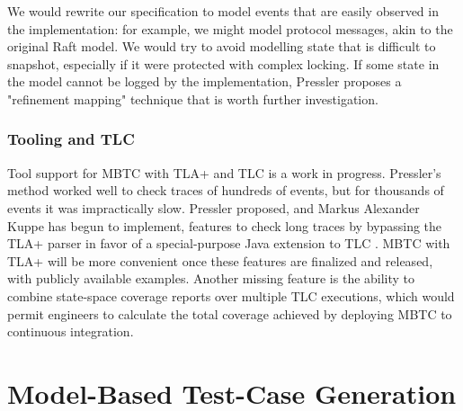 \documentclass{vldb}
\begin{document}
We would rewrite our specification to model events that are easily observed in the implementation: for example, we might model protocol messages, akin to the original Raft model.
We would try to avoid modelling state that is difficult to snapshot, especially if it were protected with complex locking.
If some state in the model cannot be logged by the implementation, Pressler proposes a "refinement mapping" technique \cite{Pressler18VerifyingSoftwareTracesTLAPlus} that is worth further investigation.

\subsubsection{Tooling and TLC}
\label{subsubsec:mbtc_tla_tlc}

Tool support for MBTC with TLA+ and TLC is a work in progress. 
Pressler's method worked well to check traces of hundreds of events, but for thousands of events it was impractically slow. 
Pressler proposed, and Markus Alexander Kuppe has begun to implement, features to check long traces by bypassing the TLA+ parser in favor of a special-purpose Java extension to TLC \cite{TLAPlusIssue413}. 
MBTC with TLA+ will be more convenient once these features are finalized and released, with publicly available examples. 
Another missing feature is the ability to combine state-space coverage reports over multiple TLC executions, which would permit engineers to calculate the total coverage achieved by deploying MBTC to continuous integration.




\section{Model-Based Test-Case Generation}
\label{sec:model_based_test_case_generation}
\end{document}
